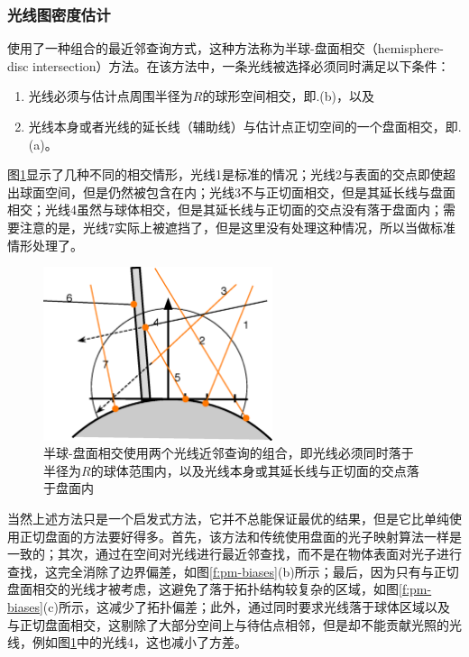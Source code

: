 \subsubsection{光线图密度估计}
\cite{a:RayMapsforGlobalIllumination}使用了一种组合的最近邻查询方式，这种方法称为半球-盘面相交（hemisphere-disc intersection）方法。在该方法中，一条光线被选择必须同时满足以下条件：

\begin{enumerate}
	\item 光线必须与估计点周围半径为$R$的球形空间相交，即.(b)，以及
	\item 光线本身或者光线的延长线（辅助线）与估计点正切空间的一个盘面相交，即.(a)。
\end{enumerate}

图\ref{f:pm-hemisphere-disc}显示了几种不同的相交情形，光线1是标准的情况；光线2与表面的交点即使超出球面空间，但是仍然被包含在内；光线3不与正切面相交，但是其延长线与盘面相交；光线4虽然与球体相交，但是其延长线与正切面的交点没有落于盘面内；需要注意的是，光线7实际上被遮挡了，但是这里没有处理这种情况，所以当做标准情形处理了。

\begin{figure}
	\sidecaption
	\includegraphics[width=0.6\textwidth]{figures/pm/hemisphere-disc}
	\caption{半球-盘面相交使用两个光线近邻查询的组合，即光线必须同时落于半径为$R$的球体范围内，以及光线本身或其延长线与正切面的交点落于盘面内}
	\label{f:pm-hemisphere-disc}
\end{figure}

当然上述方法只是一个启发式方法，它并不总能保证最优的结果，但是它比单纯使用正切盘面的方法\cite{a:AParticlePathbasedMethodforMonteCarloDensityEstimation}要好得多。首先，该方法和传统使用盘面的光子映射算法一样是一致的；其次，通过在空间对光线进行最近邻查找，而不是在物体表面对光子进行查找，这完全消除了边界偏差，如图\ref{f:pm-biases}(b)所示；最后，因为只有与正切盘面相交的光线才被考虑，这避免了落于拓扑结构较复杂的区域，如图\ref{f:pm-biases}(c)所示，这减少了拓扑偏差；此外，通过同时要求光线落于球体区域以及与正切盘面相交，这剔除了大部分空间上与待估点相邻，但是却不能贡献光照的光线，例如图\ref{f:pm-hemisphere-disc}中的光线4，这也减小了方差。

